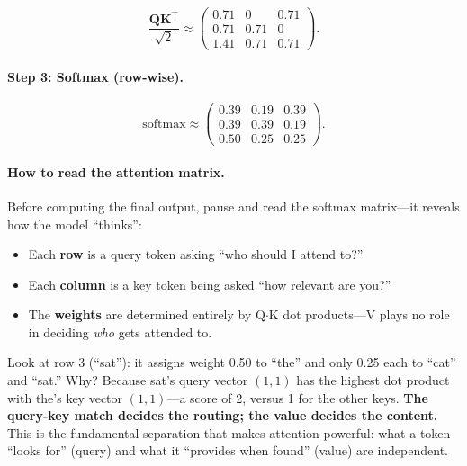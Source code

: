 \[
\frac{\mathbf{Q}\mathbf{K}^\top}{\sqrt{2}} \approx \begin{pmatrix} 0.71 & 0 & 0.71 \\ 0.71 & 0.71 & 0 \\ 1.41 & 0.71 & 0.71 \end{pmatrix}.
\]

\paragraph{Step 3: Softmax (row-wise).}\mbox{}

\medskip
\noindent{}
\medskip

\[
\text{softmax} \approx \begin{pmatrix} 0.39 & 0.19 & 0.39 \\ 0.39 & 0.39 & 0.19 \\ 0.50 & 0.25 & 0.25 \end{pmatrix}.
\]

\paragraph{How to read the attention matrix.} Before computing the final output, pause and read the softmax matrix---it reveals how the model ``thinks'':

\begin{itemize}[nosep]
    \item Each \textbf{row} is a query token asking ``who should I attend to?''
    \item Each \textbf{column} is a key token being asked ``how relevant are you?''
    \item The \textbf{weights} are determined entirely by Q$\cdot$K dot products---V plays no role in deciding \emph{who} gets attended to.
\end{itemize}

Look at row 3 (``sat''): it assigns weight 0.50 to ``the'' and only 0.25 each to ``cat'' and ``sat.'' Why? Because sat's query vector $(1,1)$ has the highest dot product with the's key vector $(1,1)$---a score of 2, versus 1 for the other keys. \textbf{The query-key match decides the routing; the value decides the content.} This is the fundamental separation that makes attention powerful: what a token ``looks for'' (query) and what it ``provides when found'' (value) are independent.

